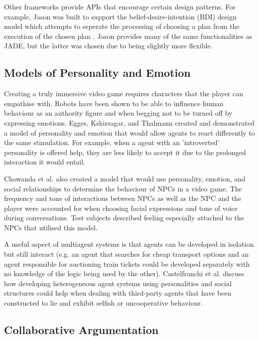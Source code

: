 \documentclass{article}
\begin{document}
Other frameworks provide APIs that encourage certain design patterns. For example, Jason was built to support the belief-desire-intention (BDI) design model which attempts to seperate the processing of choosing a plan from the execution of the chosen plan \cite{jason}. Jason provides many of the same functionalities as JADE, but the latter was chosen due to being slightly more flexible.

\subsection{Models of Personality and Emotion}

Creating a truly immersive video game requires characters that the player can empathise with. Robots have been shown to be able to influence human behaviour as an authority figure \cite{bossrobot} and when begging not to be turned off \cite{turnoffrobot} by expressing emotions. Egges, Kshirsagar, and Thalmann \cite{personalitymodel} created and demonstrated a model of personality and emotion that would allow agents to react differently to the same stimulation. For example, when a agent with an 'introverted' personality is offered help, they are less likely to accept it due to the prolonged interaction it would entail. 

Chowanda et al. \cite{skyrim} also created a model that would use personality, emotion, and social relationships to determine the behaviour of NPCs in a video game. The frequency and tone of interactions between NPCs as well as the NPC and the player were accounted for when choosing facial expressions and tone of voice during conversations. Test subjects described feeling especially attached to the NPCs that utilised this model.

A useful aspect of multiagent systems is that agents can be developed in isolation but still interact (e.g. an agent that searches for cheap transport options and an agent responsible for auctioning train tickets could be developed separately with no knowledge of the logic being used by the other). Castelfranchi et al. \cite{hetrogenousagents} discuss how developing heterogeneous agent systems using personalities and social structures could help when dealing with third-party agents that have been constructed to lie and exhibit selfish or uncooperative behaviour.

\subsection{Collaborative Argumentation}
\end{document}
